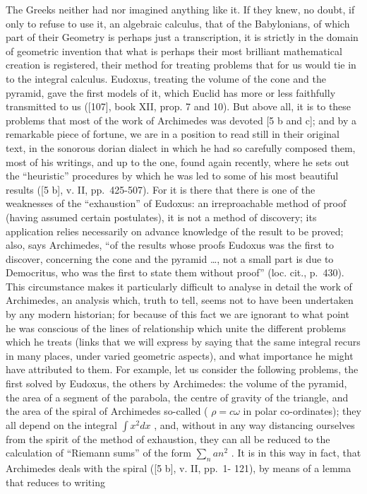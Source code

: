 The Greeks neither had nor imagined anything like it. If they knew, no doubt, if only to refuse to use it, an algebraic calculus, that of the Babylonians, of which part of their Geometry is perhaps just a transcription, it is strictly in the domain of geometric invention that what is perhaps their most brilliant mathematical creation is registered, their method for treating problems that for us would tie in to the integral calculus. Eudoxus, treating the volume of the cone and the pyramid, gave the first models of it, which Euclid has more or less faithfully transmitted to us ({[}107{]}, book XII, prop. 7 and 10). But above all, it is to these problems that most of the work of Archimedes was devoted {[}5 b and c{]}; and by a remarkable piece of fortune, we are in a position to read still in their original text, in the sonorous dorian dialect in which he had so carefully composed them, most of his writings, and up to the one, found again recently, where he sets out the ``heuristic'' procedures by which he was led to some of his most beautiful results ({[}5 b{]}, v. II, pp.~425-507). For it is there that there is one of the weaknesses of the ``exhaustion'' of Eudoxus: an irreproachable method of proof (having assumed certain postulates), it is not a method of discovery; its application relies necessarily on advance knowledge of the result to be proved; also, says Archimedes, ``of the results whose proofs Eudoxus was the first to discover, concerning the cone and the pyramid \ldots, not a small part is due to Democritus, who was the first to state them without proof'' (loc. cit., p.~430). This circumstance makes it particularly difficult to analyse in detail the work of Archimedes, an analysis which, truth to tell, seems not to have been undertaken by any modern historian; for because of this fact we are ignorant to what point he was conscious of the lines of relationship which unite the different problems which he treats (links that we will express by saying that the same integral recurs in many places, under varied geometric aspects), and what importance he might have attributed to them. For example, let us consider the following problems, the first solved by Eudoxus, the others by Archimedes: the volume of the pyramid, the area of a segment of the parabola, the centre of gravity of the triangle, and the area of the spiral of Archimedes so-called ( \(\rho = c\omega\) in polar co-ordinates); they all depend on the integral \(\int x^2 dx\) , and, without in any way distancing ourselves from the spirit of the method of exhaustion, they can all be reduced to the calculation of ``Riemann sums'' of the form \(\sum_n an^2\) . It is in this way in fact, that Archimedes deals with the spiral ({[}5 b{]}, v. II, pp.~1- 121), by means of a lemma that reduces to writing

